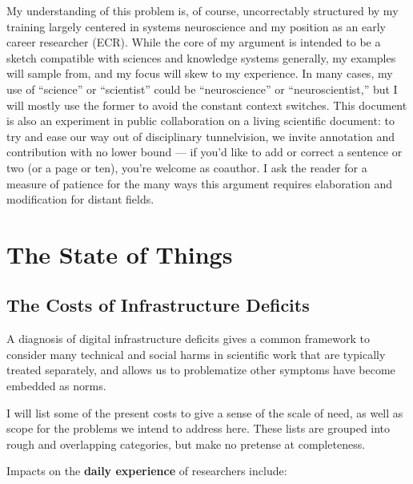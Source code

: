 My understanding of this problem is, of course, uncorrectably structured
by my training largely centered in systems neuroscience and my position
as an early career researcher (ECR). While the core of my argument is
intended to be a sketch compatible with sciences and knowledge systems
generally, my examples will sample from, and my focus will skew to my
experience. In many cases, my use of ``science'' or ``scientist'' could
be ``neuroscience'' or ``neuroscientist,'' but I will mostly use the
former to avoid the constant context switches. This document is also an
experiment in public collaboration on a living scientific document: to
try and ease our way out of disciplinary tunnelvision, we invite
annotation and contribution with no lower bound --- if you'd like to add
or correct a sentence or two (or a page or ten), you're welcome as
coauthor. I ask the reader for a measure of patience for the many ways
this argument requires elaboration and modification for distant fields.

\hypertarget{the-state-of-things}{%
\chapter{The State of Things}\label{the-state-of-things}}

\hypertarget{the-costs-of-infrastructure-deficits}{%
\section{The Costs of Infrastructure
Deficits}\label{the-costs-of-infrastructure-deficits}}

A diagnosis of digital infrastructure deficits gives a common framework
to consider many technical and social harms in scientific work that are
typically treated separately, and allows us to problematize other
symptoms have become embedded as norms.

I will list some of the present costs to give a sense of the scale of
need, as well as scope for the problems we intend to address here. These
lists are grouped into rough and overlapping categories, but make no
pretense at completeness.

Impacts on the \textbf{daily experience} of researchers include:

